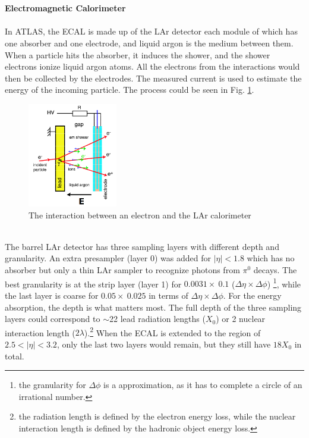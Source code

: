 \\
\\{\bf Electromagnetic Calorimeter}
\\
\\In ATLAS, the ECAL is made up of the LAr detector each module of which has one absorber and one electrode, and liquid argon is the medium between them. When a particle hits the absorber, it induces the shower, and the shower electrons ionize liquid argon atoms. All the electrons from the interactions would then be collected by the electrodes. The measured current is used to estimate the energy of the incoming particle. The process could be seen in Fig. \ref{Fig:larshower}.\\
\begin{figure}[!h]                
	\includegraphics[width=0.35\textwidth]{Chapter2/LArshower}
	\centering
	\begin{center}
		\caption{The interaction between an electron and the LAr calorimeter}
		\label{Fig:larshower}            
	\end{center}
\end{figure}
\\The barrel LAr detector has three sampling layers with different depth and granularity. An extra presampler (layer 0) was added for $|\eta|<1.8$ which has no absorber but only a thin LAr sampler to recognize photons from $\pi^{0}$ decays. The best granularity is at the strip layer (layer 1) for $0.0031\times ~0.1$ ($\Delta \eta \times \Delta \phi$) \footnote{the granularity for $\Delta \phi$ is a approximation, as it has to complete a circle of an irrational number.}, while the last layer is coarse for $0.05 \times ~0.025$ in terms of $\Delta \eta \times \Delta \phi$. For the energy absorption, the depth is what matters most. The full depth of the three sampling layers could correspond to $\sim$22 lead radiation lengths ($X_{0}$) or 2 nuclear interaction length ($2\lambda$).\footnote{the radiation length is defined by the electron energy loss, while the nuclear interaction length is defined by the hadronic object energy loss.} When the ECAL is extended to the region of $2.5<|\eta|<3.2$, only the last two layers would remain, but they still have $18X_{0}$ in total.
